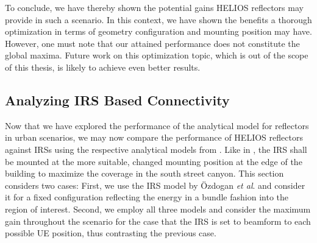 To conclude, we have thereby shown the potential gains HELIOS reflectors may provide in such a scenario. In this context, we have shown the benefits a thorough optimization in terms of geometry configuration and mounting position may have. However, one must note that our attained performance does not constitute the global maxima. Future work on this optimization topic, which is out of the scope of this thesis, is likely to achieve even better results. 
\subsection{Analyzing IRS Based Connectivity}\label{Analyzing Urban Scenario for Different IRS Models}
Now that we have explored the performance of the analytical model for reflectors in urban scenarios, we may now compare the performance of HELIOS reflectors against IRSs using the respective analytical models from . Like in , the IRS shall be mounted at the more suitable, changed mounting position at the edge of the building to maximize the coverage in the south street canyon. This section considers two cases: First, we use the IRS model by Özdogan \emph{et al}. \cite{8936989}  and consider it for a fixed configuration reflecting the energy in a bundle fashion into the region of interest. Second, we employ all three models \cite{8936989, ntontin2021optimal, tang2020wireless} and consider the maximum gain throughout the scenario for the case that the IRS is set to beamform to each possible UE position, thus contrasting the previous case.

